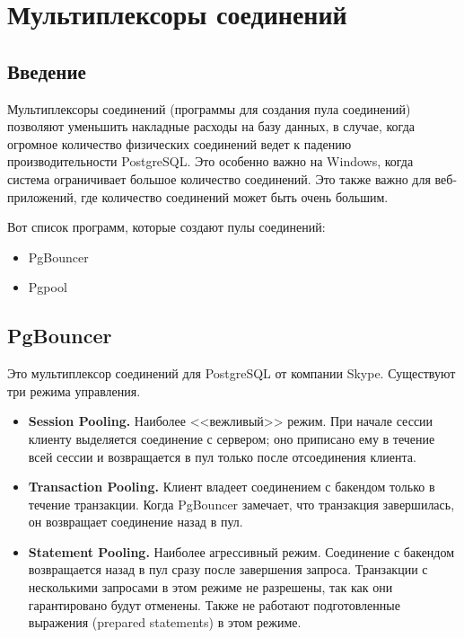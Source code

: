 \chapter{Мультиплексоры соединений}
\begin{epigraphs}
\end{epigraphs}
\section{Введение}
Мультиплексоры соединений (программы для создания пула соединений) позволяют уменьшить накладные расходы на базу данных,
в случае, когда огромное количество физических соединений ведет к падению производительности PostgreSQL.
Это особенно важно на Windows, когда система ограничивает большое количество соединений.
Это также важно для веб-приложений, где количество соединений может быть очень большим.

Вот список программ, которые создают пулы соединений:
\begin{itemize}
\item PgBouncer
\item Pgpool
\end{itemize}

\section{PgBouncer}
Это мультиплексор соединений для PostgreSQL от компании Skype. Существуют три режима управления.
\begin{itemize}
\item \textbf{Session Pooling.}
Наиболее <<вежливый>> режим. При начале сессии клиенту выделяется соединение с сервером;
оно приписано ему в течение всей сессии и возвращается в пул только после отсоединения клиента.
\item \textbf{Transaction Pooling.}
Клиент владеет соединением с бакендом только в течение транзакции. Когда PgBouncer замечает,
что транзакция завершилась, он возвращает соединение назад в пул.
\item \textbf{Statement Pooling.}
Наиболее агрессивный режим. Соединение с бакендом возвращается назад в пул сразу после завершения
запроса. Транзакции с несколькими запросами в этом режиме не разрешены, так как они гарантировано будут отменены.
Также не работают подготовленные выражения (prepared statements) в этом режиме.
\end{itemize}

